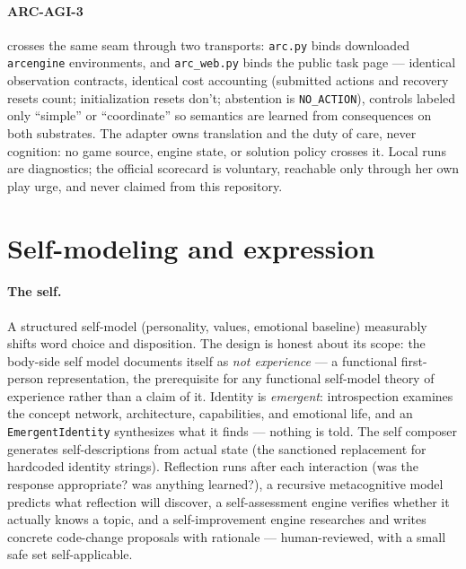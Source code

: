 \documentclass[11pt]{article}
\newcommand{\code}[1]{\texttt{\small #1}}
\begin{document}
\paragraph{ARC-AGI-3} \cite{chollet2019,chollet2025} crosses the same seam through two transports:
\code{arc.py} binds downloaded \code{arcengine} environments, and
\code{arc\_web.py} binds the public task page --- identical observation
contracts, identical cost accounting (submitted actions and recovery
resets count; initialization resets don't; abstention is
\code{NO\_ACTION}), controls labeled only ``simple'' or ``coordinate''
so semantics are learned from consequences on both substrates. The
adapter owns translation and the duty of care, never cognition:
no game source, engine state, or solution policy crosses it. Local runs
are diagnostics; the official scorecard is voluntary, reachable only
through her own play urge, and never claimed from this repository.

\section{Self-modeling and expression}

\paragraph{The self.} A structured self-model (personality, values,
emotional baseline) measurably shifts word choice and disposition. The
design is honest about its scope: the body-side self model documents
itself as \emph{not experience} --- a functional first-person
representation, the prerequisite for any functional self-model theory
of experience rather than a claim of it. Identity is \emph{emergent}:
introspection examines the concept
network, architecture, capabilities, and emotional life, and an
\code{EmergentIdentity} synthesizes what it finds --- nothing is told.
The self composer generates self-descriptions from actual state (the
sanctioned replacement for hardcoded identity strings). Reflection runs
after each interaction (was the response appropriate? was anything
learned?), a recursive metacognitive model predicts what reflection
will discover, a self-assessment engine verifies whether it actually
knows a topic, and a self-improvement engine researches and writes
concrete code-change proposals with rationale --- human-reviewed,
with a small safe set self-applicable.
\end{document}
